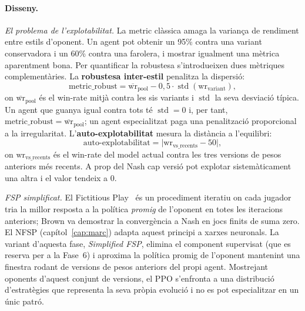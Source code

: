 \paragraph{Disseny.}

\emph{El problema de l'explotabilitat.} La \(\text{metric}\) clàssica amaga la variança
de rendiment entre estils d'oponent. Un agent pot obtenir un 95\% contra una variant
conservadora i un 60\% contra una farolera, i mostrar igualment una mètrica aparentment
bona. Per quantificar la robustesa s'introdueixen dues mètriques complementàries. La
\textbf{robustesa inter-estil} penalitza la dispersió:
\begin{equation}
  \text{metric\_robust} = \overline{\text{wr}}_{\text{pool}} - 0{,}5 \cdot
  \operatorname{std}(\text{wr}_{\text{variant}}),
  \label{eq:metric-robust}
\end{equation}
on \(\overline{\text{wr}}_{\text{pool}}\) és el win-rate mitjà contra les sis variants i
\(\operatorname{std}\) la seva desviació típica. Un agent que guanya igual contra tots
té \(\operatorname{std}=0\) i, per tant,
\(\text{metric\_robust} = \overline{\text{wr}}_{\text{pool}}\); un agent especialitzat
paga una penalització proporcional a la irregularitat. L'\textbf{auto-explotabilitat}
mesura la distància a l'equilibri:
\begin{equation}
  \text{auto-explotabilitat} = \lvert \text{wr}_{\text{vs\_recents}} - 50 \rvert,
  \label{eq:exploit-sp}
\end{equation}
on \(\text{wr}_{\text{vs\_recents}}\) és el win-rate del model actual contra les tres
versions de pesos anteriors més recents. A prop del Nash cap versió pot explotar
sistemàticament una altra i el valor tendeix a 0.

\emph{\ac{FSP} simplificat.} El Fictitious
Play~\cite{brown1951fictitious} és un procediment iteratiu on cada jugador tria la millor
resposta a la política \emph{promig} de l'oponent en totes les iteracions anteriors; Brown
va demostrar la convergència a Nash en jocs finits de suma zero. El \ac{NFSP}
(capítol~\ref{cap:marc}) adapta aquest principi a xarxes neuronals. La variant d'aquesta
fase, \emph{Simplified \ac{FSP}}, elimina el component supervisat (que es reserva per a la
Fase~6) i aproxima la política promig de l'oponent mantenint una finestra rodant de
versions de pesos anteriors del propi agent. Mostrejant oponents d'aquest conjunt de
versions, el PPO
s'enfronta a una distribució d'estratègies que representa la seva pròpia evolució
i no es pot especialitzar en un únic patró.

